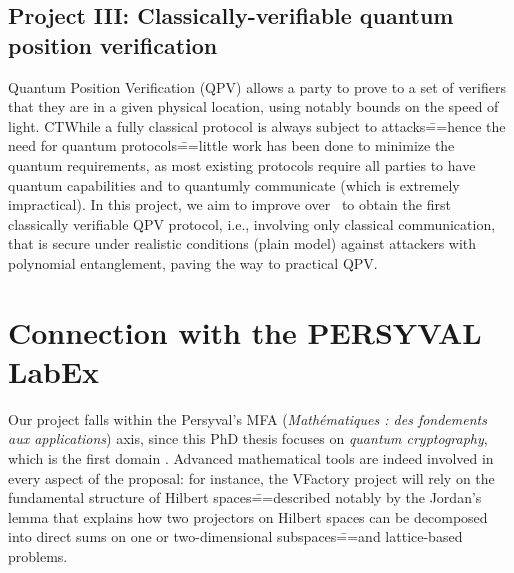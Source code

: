 \subsection{Project III: Classically-verifiable quantum position verification}

Quantum Position Verification (QPV) allows a party to prove to a set of verifiers that they are in a given physical location, using notably bounds on the speed of light. CTWhile a fully classical protocol is always subject to attacks\===hence the need for quantum protocols\===little work has been done to minimize the quantum requirements, as most existing protocols require all parties to have quantum capabilities and to quantumly communicate (which is extremely impractical). In this project, we aim to improve over~\cite{LLQ21_BeatingClassicalImpossibility} to obtain the first classically verifiable QPV protocol, i.e., involving only classical communication, that is secure under realistic conditions (plain model) against attackers with polynomial entanglement, paving the way to practical QPV. %

\section{Connection with the PERSYVAL LabEx}

Our project falls within the Persyval's MFA (\emph{Mathématiques : des fondements aux applications}) axis, since this PhD thesis focuses on \emph{quantum cryptography}, which is the first domain . Advanced mathematical tools are indeed involved in every aspect of the proposal: for instance, the VFactory project will rely on the fundamental structure of Hilbert spaces\===described notably by the Jordan's lemma that explains how two projectors on Hilbert spaces can be decomposed into direct sums on one or two-dimensional subspaces\===and lattice-based problems.

